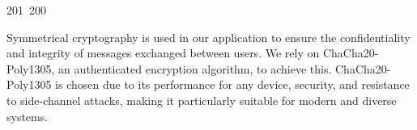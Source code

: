 201~200~\documentclass{article}
\begin{document}
	                                                                                                                                                                                                                                                                                                	                                                                                                                                        	    	                                                                                                	                                                                                                                                                                                                                                                                                                                                	                                                                        	                                                                        	                                                                                                                                        	                                                                                                                                                                                                                        	                                                                                                                            	                                                                	                                                                                        Symmetrical cryptography is used in our application to ensure the confidentiality and integrity of messages exchanged between users. We rely on ChaCha20-Poly1305, an authenticated encryption algorithm, to achieve this. ChaCha20-Poly1305 is chosen due to its performance for any device, security, and resistance to side-channel attacks, making it particularly suitable for modern and diverse systems.
\end{document}
